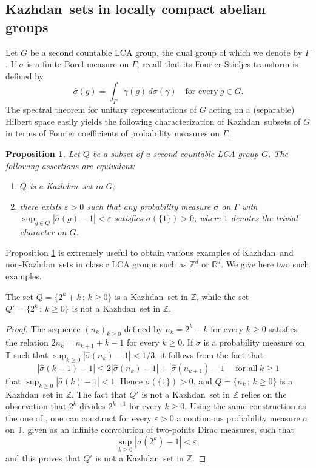\documentclass[11pt,english,a4paper]{smfart}
\numberwithin{equation}{section}
\newtheorem{proposition}[theorem]{Proposition}
\theoremstyle{definition}
\begin{document}
\subsection{{Kazhdan}\ sets in locally compact abelian groups}\label{Subsection 8.1}
Let $G$ be a second countable LCA group, the dual group of which we denote by $\Gamma$.  If $\sigma $ is a finite Borel measure on $\Gamma $, recall that its Fourier-Stieljes transform is defined by 
\[
\widehat{\sigma }(g)=\int_{\Gamma }\gamma (g)\,d\sigma (\gamma )\quad\textrm{for every}\ g\in G.
\] 
The spectral theorem for unitary representations of $G$ acting on a (separable) Hilbert space easily yields the following characterization of {Kazhdan}\ subsets of $G$ in terms of Fourier coefficients of probability measures on $\Gamma $.
\begin{proposition}\label{Proposition A}
 Let $Q$ be a subset of  a second countable LCA group $G$. The following assertions are equivalent:
\begin{enumerate}
 \item [(1)] ${Q}$ is a {Kazhdan}\ set in $G$;
\item[(2)] there exists $\varepsilon >0$ such that any probability measure $\sigma $ on $\Gamma $ with $\sup_{g\in{Q}}|\widehat{\sigma }(g)-1|<\varepsilon$
satisfies $\sigma (\{{1}\})>0$, where ${1}$ denotes the trivial character on $G$.
\end{enumerate}
\end{proposition}
Proposition \ref{Proposition A} is extremely useful to obtain various examples of {Kazhdan}\ and non-{Kazhdan}\ sets in classic LCA groups such as ${\ensuremath{\mathbb Z}}^{d}$ or ${\ensuremath{\mathbb R}}^{d}$. We give here two such examples.
\begin{example}\label{Example B}
 The set ${Q}=\{2^{k}+k\,;\,k\ge 0\}$ is a {Kazhdan}\ set in ${\ensuremath{\mathbb Z}}$, while the set ${Q}'=\{2^{k}\,;\,k\ge 0\}$ is not a {Kazhdan}\ set in ${\ensuremath{\mathbb Z}}$.
\end{example}
\begin{proof}{}
 The sequence $(n_{k})_{k\ge 0}$ defined by $n_{k}=2^{k}+k$ for every $k\ge 0$ satisfies the relation $2n_{k}=n_{k+1}+k-1$ for every 
 $k\ge 0$. If $\sigma $ is a probability measure on ${\ensuremath{\mathbb T}}$ such that $\sup_{k\ge 0}|\widehat{\sigma }(n_{k})-1|<1/3$, it follows from the fact that 
\[
|\widehat{\sigma }(k-1)-1|\le 2|{\widehat{{\sigma }}}(n_{k})-1|+|{\widehat{{\sigma }}}(n_{k+1})-1| \quad\textrm{for all}\ k\ge 1
\]
that $\sup_{k\ge 0}|\widehat{\sigma }(k)-1|<1$. Hence $\sigma (\{1\})>0$, and
${Q}=\{n_{k}\,;\,k\ge 0\}$ is a {Kazhdan}\ set in ${\ensuremath{\mathbb Z}}$. The fact that ${Q}'$ is not a {Kazhdan}\ set in ${\ensuremath{\mathbb Z}}$ relies on the observation that $2^{k}$ divides $2^{k+1}$ for every $k\ge 0$. Using the same construction as the one of \cite[Prop.~3.9]{EG}, one can construct for every $\varepsilon >0$ a continuous probability measure $\sigma $ on ${\ensuremath{\mathbb T}}$, given as an infinite convolution of two-points Dirac measures, such that 
\[
\sup_{k\ge 0}|\widehat{\sigma }(2^{k})-1|<\varepsilon,
\]
and this proves that ${Q}'$ is not a {Kazhdan}\ set in ${\ensuremath{\mathbb Z}}$.
\end{proof}
\end{document}
